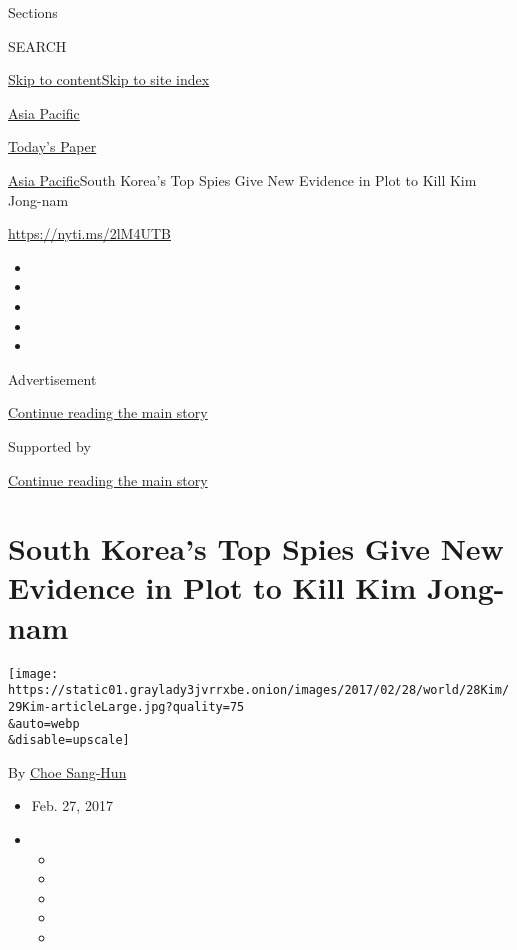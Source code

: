 Sections

SEARCH

\protect\hyperlink{site-content}{Skip to
content}\protect\hyperlink{site-index}{Skip to site index}

\href{https://www.nytimes3xbfgragh.onion/section/world/asia}{Asia
Pacific}

\href{https://myaccount.nytimes3xbfgragh.onion/auth/login?response_type=cookie\&client_id=vi}{}

\href{https://www.nytimes3xbfgragh.onion/section/todayspaper}{Today's
Paper}

\href{/section/world/asia}{Asia Pacific}\textbar{}South Korea's Top
Spies Give New Evidence in Plot to Kill Kim Jong-nam

\url{https://nyti.ms/2lM4UTB}

\begin{itemize}
\item
\item
\item
\item
\item
\end{itemize}

Advertisement

\protect\hyperlink{after-top}{Continue reading the main story}

Supported by

\protect\hyperlink{after-sponsor}{Continue reading the main story}

\hypertarget{south-koreas-top-spies-give-new-evidence-in-plot-to-kill-kim-jong-nam}{%
\section{South Korea's Top Spies Give New Evidence in Plot to Kill Kim
Jong-nam}\label{south-koreas-top-spies-give-new-evidence-in-plot-to-kill-kim-jong-nam}}

\texttt{[image: https://static01.graylady3jvrrxbe.onion/images/2017/02/28/world/28Kim/29Kim-articleLarge.jpg?quality=75\\\&auto=webp\\\&disable=upscale]}

By \href{http://www.nytimes3xbfgragh.onion/by/choe-sang-hun}{Choe
Sang-Hun}

\begin{itemize}
\item
  Feb. 27, 2017
\item
  \begin{itemize}
  \item
  \item
  \item
  \item
  \item
  \end{itemize}
\end{itemize}

